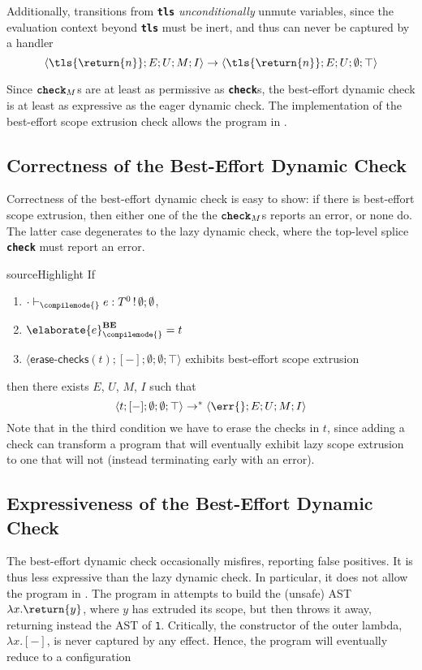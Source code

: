 Additionally, transitions from \textbf{\texttt{tls}} \textit{unconditionally} unmute variables, since the evaluation context beyond \textbf{\texttt{tls}} must be inert, and thus can never be captured by a handler
\[\langle \tls{\return{n}}; E; U; M; I \rangle \to \langle \tls{\return{n}}; E; U; \emptyset; \top \rangle\]

Since $\textbf{\texttt{check}}_M$s are at least as permissive as \textbf{\texttt{check}}s, the best-effort dynamic check is at least as expressive as the eager dynamic check. The implementation of the best-effort scope extrusion check allows the program in . 

\subsection{Correctness of the Best-Effort Dynamic Check}\label{subsection:best-effort-correct}
Correctness of the best-effort dynamic check is easy to show: if there is best-effort scope extrusion, then either one of the the $\textbf{\texttt{check}}_M$s reports an error, or none do. The latter case degenerates to the lazy dynamic check, where the top-level splice \textbf{\texttt{check}} must report an error. 

\begin{theorem}{sourceHighlight} If 
  \begin{enumerate}
    \item $\cdot \vdash_{\compilemode{}} e: T^0 \, ! \, \emptyset;\emptyset$, 
    \item $\elaborate{e}_{\compilemode{}}^{\textbf{BE}} = t$
    \item $\langle \textsf{erase-checks}(t); [-]; \emptyset; \emptyset; \top \rangle$ exhibits best-effort scope extrusion 
  \end{enumerate}
  then there exists $E$, $U$, $M$, $I$ such that \[\langle t; [-]; \emptyset; \emptyset; \top \rangle \to^{*}\langle \err{}; E; U; M; I \rangle\]
Note that in the third condition we have to erase the checks in $t$, since adding a check can transform a program that will eventually exhibit lazy scope extrusion to one that will not (instead terminating early with an error).
\end{theorem}

\subsection{Expressiveness of the Best-Effort Dynamic Check}\label{subsection:best-effort-expressive}
The best-effort dynamic check occasionally misfires, reporting false positives. It is thus less expressive than the lazy dynamic check. In particular, it does not allow the program in . The program in  attempts to build the (unsafe) AST $\lambda x.\return{y}$, where $y$ has extruded its scope, but then throws it away, returning instead the AST of \texttt{1}. Critically, the constructor of the outer lambda, $\lambda x. [-]$, is never captured by any effect. Hence, the program will eventually reduce to a configuration 

